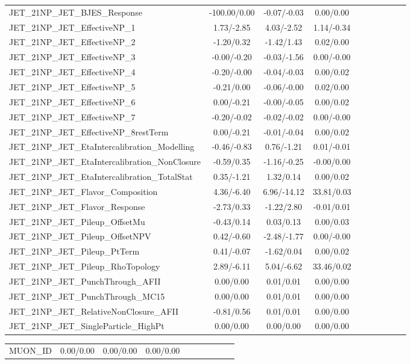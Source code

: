 \begin{table}[h]
\begin{center}
\begin{tabular}{l|ccccccccc}
JET\_21NP\_JET\_BJES\_Response &-100.00/0.00 &-0.07/-0.03 &0.00/0.00 \\
JET\_21NP\_JET\_EffectiveNP\_1 &1.73/-2.85 &4.03/-2.52 &1.14/-0.34 \\
JET\_21NP\_JET\_EffectiveNP\_2 &-1.20/0.32 &-1.42/1.43 &0.02/0.00 \\
JET\_21NP\_JET\_EffectiveNP\_3 &-0.00/-0.20 &-0.03/-1.56 &0.00/-0.00 \\
JET\_21NP\_JET\_EffectiveNP\_4 &-0.20/-0.00 &-0.04/-0.03 &0.00/0.02 \\
JET\_21NP\_JET\_EffectiveNP\_5 &-0.21/0.00 &-0.06/-0.00 &0.02/0.00 \\
JET\_21NP\_JET\_EffectiveNP\_6 &0.00/-0.21 &-0.00/-0.05 &0.00/0.02 \\
JET\_21NP\_JET\_EffectiveNP\_7 &-0.20/-0.02 &-0.02/-0.02 &0.00/-0.00 \\
JET\_21NP\_JET\_EffectiveNP\_8restTerm &0.00/-0.21 &-0.01/-0.04 &0.00/0.02 \\
JET\_21NP\_JET\_EtaIntercalibration\_Modelling &-0.46/-0.83 &0.76/-1.21 &0.01/-0.01 \\
JET\_21NP\_JET\_EtaIntercalibration\_NonClosure &-0.59/0.35 &-1.16/-0.25 &-0.00/0.00 \\
JET\_21NP\_JET\_EtaIntercalibration\_TotalStat &0.35/-1.21 &1.32/0.14 &0.00/0.02 \\
JET\_21NP\_JET\_Flavor\_Composition &4.36/-6.40 &6.96/-14.12 &33.81/0.03 \\
JET\_21NP\_JET\_Flavor\_Response &-2.73/0.33 &-1.22/2.80 &-0.01/0.01 \\
JET\_21NP\_JET\_Pileup\_OffsetMu &-0.43/0.14 &0.03/0.13 &0.00/0.03 \\
JET\_21NP\_JET\_Pileup\_OffsetNPV &0.42/-0.60 &-2.48/-1.77 &0.00/-0.00 \\
JET\_21NP\_JET\_Pileup\_PtTerm &0.41/-0.07 &-1.62/0.04 &0.00/0.02 \\
JET\_21NP\_JET\_Pileup\_RhoTopology &2.89/-6.11 &5.04/-6.62 &33.46/0.02 \\
JET\_21NP\_JET\_PunchThrough\_AFII &0.00/0.00 &0.01/0.01 &0.00/0.00 \\
JET\_21NP\_JET\_PunchThrough\_MC15 &0.00/0.00 &0.01/0.01 &0.00/0.00 \\
JET\_21NP\_JET\_RelativeNonClosure\_AFII &-0.81/0.56 &0.01/0.01 &0.00/0.00 \\
JET\_21NP\_JET\_SingleParticle\_HighPt &0.00/0.00 &0.00/0.00 &0.00/0.00 \\
\hline \end{tabular} \end{center} \end{table} \begin{table}[h] \scriptsize \begin{center} \begin{tabular}{l|ccccccccc} \hline MUON\_ID &0.00/0.00 &0.00/0.00 &0.00/0.00 \\

\end{tabular}
\end{center}
\end{table}
